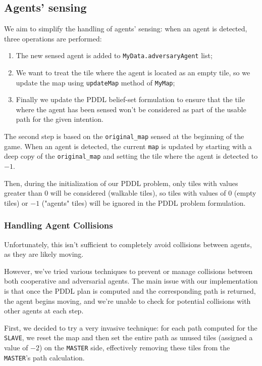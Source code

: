 \documentclass[10pt]{article}
\begin{document}
\subsection{Agents' sensing}
\label{agents}
We aim to simplify the handling of agents' sensing: when an agent is detected, three operations are performed:

\begin{enumerate}
    \item The new sensed agent is added to \texttt{MyData.adversaryAgent} list;
    \item We want to treat the tile where the agent is located as an empty tile, so we update the map using \texttt{updateMap} method of \texttt{MyMap};
    \item Finally we update the PDDL belief-set formulation to ensure that the tile where the agent has been sensed won't be considered as part of the usable path for the given intention.
\end{enumerate}

The second step is based on the \texttt{original\_map} sensed at the beginning of the game. When an agent is detected, the current \texttt{map} is updated by starting with a deep copy of the \texttt{original\_map} and setting the tile where the agent is detected to $-1$. 

Then, during the initialization of our PDDL problem, only tiles with values greater than $0$ will be considered (walkable tiles), so tiles with values of $0$ (empty tiles) or $-1$ ("agents" tiles) will be ignored in the PDDL problem formulation.

\subsubsection{Handling Agent Collisions}

Unfortunately, this isn't sufficient to completely avoid collisions between agents, as they are likely moving.

However, we've tried various techniques to prevent or manage collisions between both cooperative and adversarial agents. The main issue with our implementation is that once the PDDL plan is computed and the corresponding path is returned, the agent begins moving, and we're unable to check for potential collisions with other agents at each step.  

First, we decided to try a very invasive technique: for each path computed for the \texttt{SLAVE}, we reset the map and then set the entire path as unused tiles (assigned a value of $-2$) on the \texttt{MASTER} side, effectively removing these tiles from the \texttt{MASTER}'s path calculation. 
\end{document}

